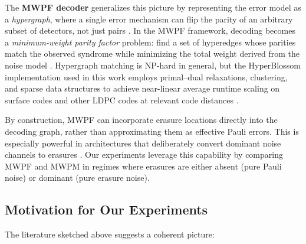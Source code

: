\documentclass[11pt, notitlepage, letterpaper]{article}
\begin{document}
The \textbf{MWPF decoder} generalizes this picture by representing the error model as a \emph{hypergraph}, where a single error mechanism can flip the parity of an arbitrary subset of detectors, not just pairs \cite{wu_yuewuomwpf_2025}\cite{wu_minimum-weight_2025}. In the MWPF framework, decoding becomes a \emph{minimum-weight parity factor} problem: find a set of hyperedges whose parities match the observed syndrome while minimizing the total weight derived from the noise model \cite{wu_minimum-weight_2025}. Hypergraph matching is NP-hard in general, but the HyperBlossom implementation used in this work employs primal--dual relaxations, clustering, and sparse data structures to achieve near-linear average runtime scaling on surface codes and other LDPC codes at relevant code distances \cite{wu_minimum-weight_2025}.

By construction, MWPF can incorporate erasure locations directly into the decoding graph, rather than approximating them as effective Pauli errors. This is especially powerful in architectures that deliberately convert dominant noise channels to erasures \cite{wu_erasure_2022}\cite{kubica_erasure_2023}\cite{gu_fault-tolerant_2025}\cite{chadwick_erasure_2025}. Our experiments leverage this capability by comparing MWPF and MWPM in regimes where erasures are either absent (pure Pauli noise) or dominant (pure erasure noise).

\subsection{Motivation for Our Experiments}
\label{subsec:motivation}

The literature sketched above suggests a coherent picture:
\end{document}
